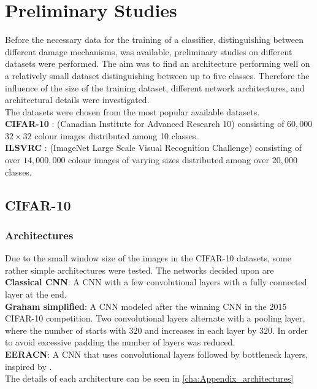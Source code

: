 \chapter{Preliminary Studies}

Before the necessary data for the training of a classifier, distinguishing between different damage mechanisms, was available, preliminary studies on different datasets were performed. The aim was to find an architecture performing well on a relatively small dataset distinguishing between up to five classes. Therefore the influence of the size of the training dataset, different network architectures, and architectural details were investigated. \\

\noindent The datasets were chosen from the most popular available datasets. \\
\noindent \textbf{CIFAR-10} \cite{Krizhevsky2009}: (Canadian Institute for Advanced Research 10) consisting of $60,000$ $32\times 32$ colour images distributed among 10 classes. \\
\noindent \textbf{ILSVRC} \cite{imagenet_cvpr09}: (ImageNet Large Scale Visual Recognition Challenge) consisting of over $14,000,000$ colour images of varying sizes distributed among over $20,000$ classes.

\section{CIFAR-10}

\subsection{Architectures}
Due to the small window size of the images in the CIFAR-10 datasets, some rather simple architectures were tested. The networks decided upon are \\
\noindent\textbf{Classical CNN}: A CNN with a few convolutional layers with a fully connected layer at the end. \\
\noindent\textbf{Graham simplified}: A CNN modeled after the winning CNN in the 2015 CIFAR-10 competition. Two convolutional layers alternate with a pooling layer, where the number of starts with $320$ and increases in each layer by $320$. In order to avoid excessive padding the number of layers was reduced. \\
\noindent\textbf{EERACN}: A CNN that uses convolutional layers followed by bottleneck layers, inspired by \cite{Xu2015}. \\
The details of each architecture can be seen in \ref{cha:Appendix_architectures}

